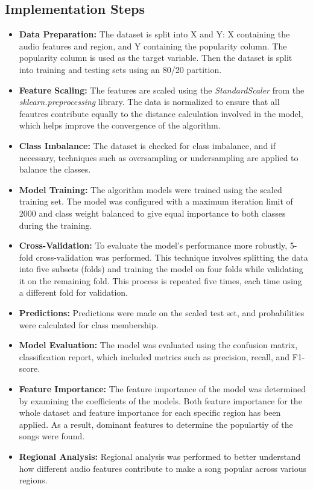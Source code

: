 \subsection{Implementation Steps}
\begin{itemize}
    \item \textbf{Data Preparation: } The dataset is split into X and Y: X containing the audio features and region, and Y containing the popularity column.
    The popularity column is used as the target variable. Then the dataset is split into training and testing sets using an 80/20 partition.
    \item \textbf{Feature Scaling: } The features are scaled using the \textit{StandardScaler} from the \textit{sklearn.preprocessing} library. The data is normalized to ensure that all feautres contribute equally to the distance calculation involved in the model, which helps improve the convergence of the algorithm.
    \item \textbf{Class Imbalance: } The dataset is checked for class imbalance, and if necessary, techniques such as oversampling or undersampling are applied to balance the classes.
  
    \item \textbf{Model Training: } The algorithm models were trained using the scaled training set. The model was
    configured with a maximum iteration limit of 2000 and class weight balanced to give equal importance to both classes during the training.
    \item \textbf{Cross-Validation: } To evaluate the model's performance more robustly, 5-fold cross-validation was performed.
    This technique involves splitting the data into five subsets (folds) and training the model on four folds while validating it on the remaining
    fold. This process is repeated five times, each time using a different fold for validation.
    \item \textbf{Predictions: } Predictions were made on the scaled test set, and probabilities were calculated for class membership. 
    \item \textbf{Model Evaluation: } The model was evaluated using the confusion matrix, classification report, which included metrics such as precision, recall, and F1-score.
    \item \textbf{Feature Importance: } The feature importance of the model was determined by examining the coefficients of the models. Both feature importance for the whole dataset and feature importance for each specific region has been applied. As a result, dominant features to determine the populartiy of the songs were found.
    \item \textbf{Regional Analysis: } Regional analysis was performed to better understand how different audio features contribute to make a song popular across various regions.
\end{itemize} 


